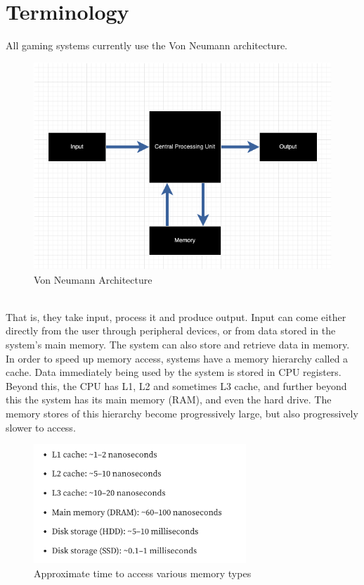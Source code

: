 \documentclass{article}
\begin{document}
\section{Terminology}
All gaming systems currently use the Von Neumann architecture.\\
\begin{figure}[htbp]
\includegraphics[width=\textwidth]{neumann}
\caption{Von Neumann Architecture}
\end{figure}
\\
That is, they take input, process it and produce output. Input can come either directly from the user through peripheral devices, or from data stored in the system's main memory. The system can also store and retrieve data in memory. In order to speed up memory access, systems have a memory hierarchy called a cache. Data immediately being used by the system is stored in CPU registers. Beyond this, the CPU has L1, L2 and sometimes L3 cache, and further beyond this the system has its main memory (RAM), and even the hard drive. The memory stores of this hierarchy become progressively large, but also progressively slower to access.\\
\begin{figure}[htbp]
	\centering
	\includegraphics[width=8cm]{access_time}
	\caption{Approximate time to access various memory types \cite{accessTime}}
\end{figure}
\end{document}
